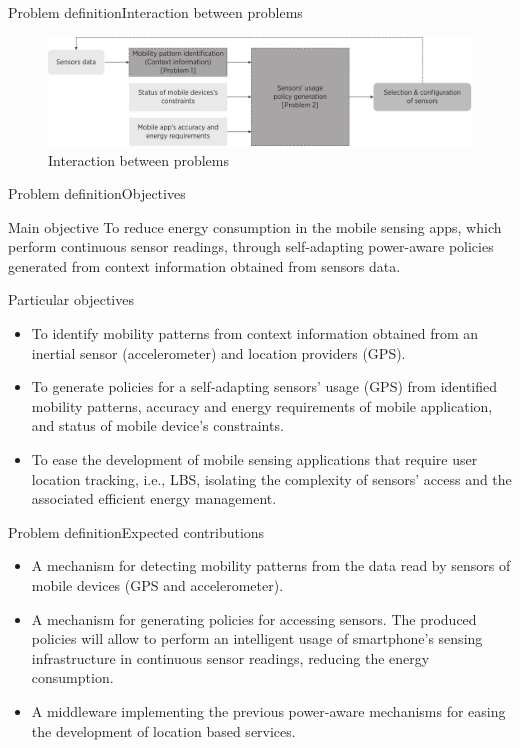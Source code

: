 \documentclass[10pt,xcolor={dvipsnames},handout]{beamer}
\begin{document}
\begin{frame}{Problem definition}{Interaction between problems}
\begin{figure}[tb]
  \centering
  \includegraphics[width=\textwidth]{../../../resources/images/vectors/problems-incorporation}
  \caption{Interaction between problems}
  \label{fig:problems-incorporation}
\end{figure}
\end{frame}

\begin{frame}{Problem definition}{Objectives}
\begin{exampleblock}{Main objective}
To reduce energy consumption in the mobile sensing apps, which perform continuous sensor readings, through self-adapting power-aware policies generated from context information obtained from sensors data.
\end{exampleblock}
\pause
\begin{exampleblock}{Particular objectives}
\small
\begin{itemize}
  \item To identify mobility patterns from context information obtained from an inertial sensor (accelerometer) and location providers (GPS).
  \pause
  \item To generate policies for a self-adapting sensors' usage (GPS) from identified mobility patterns, accuracy and energy requirements of mobile application, and status of mobile device's constraints. 
  \pause
  \item To ease the development of mobile sensing applications that require user location tracking, i.e., LBS, isolating the complexity of sensors' access and the associated efficient energy management.
\end{itemize}
\end{exampleblock}
\end{frame}

\begin{frame}{Problem definition}{Expected contributions}
\begin{itemize}
  \item<+-> A mechanism for detecting mobility patterns from the data read by sensors of mobile devices (GPS and accelerometer).
  \item<+-> A mechanism for generating policies for accessing sensors.
  The produced policies will allow to perform an intelligent usage of smartphone's sensing infrastructure in continuous sensor readings, reducing the energy consumption.
  \item<+-> A middleware implementing the previous power-aware mechanisms for easing the development of location based services.
\end{itemize}
\end{frame}
\end{document}
